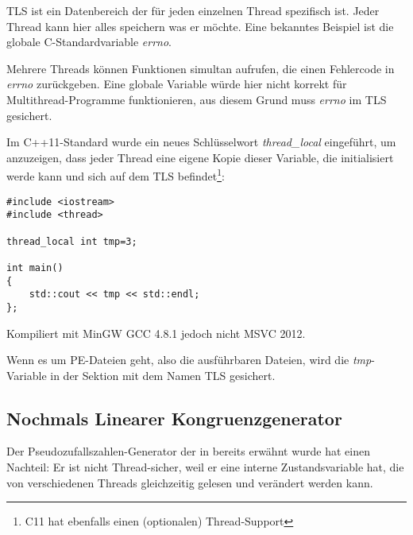 \label{TLS}

TLS ist ein Datenbereich der für jeden einzelnen Thread spezifisch ist.
Jeder Thread kann hier alles speichern was er möchte.
Eine bekanntes Beispiel ist die globale C-Standardvariable \emph{errno}.

Mehrere Threads können Funktionen simultan aufrufen, die einen Fehlercode in \emph{errno} zurückgeben.
Eine globale Variable würde hier nicht korrekt für Multithread-Programme funktionieren,
aus diesem Grund muss \emph{errno} im \ac{TLS} gesichert.

Im C++11-Standard wurde ein neues Schlüsselwort \emph{thread\_local} eingeführt,
um anzuzeigen, dass jeder Thread eine eigene Kopie dieser Variable, die initialisiert werde kann
und sich auf dem \ac{TLS} befindet\footnote{ C11 hat ebenfalls einen (optionalen) Thread-Support}:

\begin{lstlisting}[caption=C++11]
#include <iostream>
#include <thread>

thread_local int tmp=3;

int main()
{
	std::cout << tmp << std::endl;
};
\end{lstlisting}

Kompiliert mit MinGW GCC 4.8.1 jedoch nicht MSVC 2012.

Wenn es um PE-Dateien geht, also die ausführbaren Dateien, wird die \emph{tmp}-Variable
in der Sektion mit dem Namen \ac{TLS} gesichert.

\subsection{Nochmals Linearer Kongruenzgenerator}
\label{LCG_TLS}

Der Pseudozufallszahlen-Generator der in  bereits erwähnt wurde hat einen Nachteil:
Er ist nicht Thread-sicher, weil er eine interne Zustandsvariable hat, die von verschiedenen Threads
gleichzeitig gelesen und verändert werden kann.



